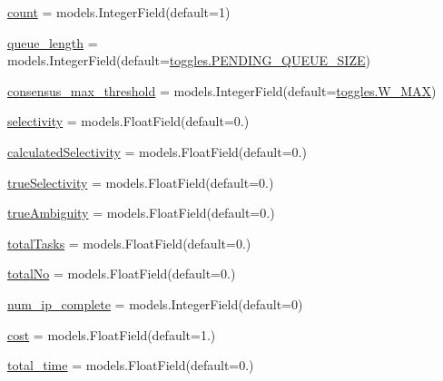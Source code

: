 \begin{DoxyCompactItemize}
\item 
\mbox{\hyperlink{classdynamicfilterapp_1_1models_1_1_predicate_ae11b3deb3de3df7dc48e439074023e35}{count}} = models.\+Integer\+Field(default=1)
\item 
\mbox{\hyperlink{classdynamicfilterapp_1_1models_1_1_predicate_a1bdc57110df8b3c72e240a7f100b4096}{queue\+\_\+length}} = models.\+Integer\+Field(default=\mbox{\hyperlink{namespacedynamicfilterapp_1_1toggles_a642cb0e1f266db761b270ea65af5425a}{toggles.\+P\+E\+N\+D\+I\+N\+G\+\_\+\+Q\+U\+E\+U\+E\+\_\+\+S\+I\+ZE}})
\item 
\mbox{\hyperlink{classdynamicfilterapp_1_1models_1_1_predicate_a8bd4e3573ed7514dc98a1615fe047c23}{consensus\+\_\+max\+\_\+threshold}} = models.\+Integer\+Field(default=\mbox{\hyperlink{namespacedynamicfilterapp_1_1toggles_add63171ca968cbd5ca4d60dfbf9a2746}{toggles.\+W\+\_\+\+M\+AX}})
\item 
\mbox{\hyperlink{classdynamicfilterapp_1_1models_1_1_predicate_af0e245c39a758c26c7eadd206d81ae15}{selectivity}} = models.\+Float\+Field(default=0.)
\item 
\mbox{\hyperlink{classdynamicfilterapp_1_1models_1_1_predicate_a188ea6f444715e91f6b9e0860893ed16}{calculated\+Selectivity}} = models.\+Float\+Field(default=0.)
\item 
\mbox{\hyperlink{classdynamicfilterapp_1_1models_1_1_predicate_ad83f72684951b87b2dc27c4e469b2bb5}{true\+Selectivity}} = models.\+Float\+Field(default=0.)
\item 
\mbox{\hyperlink{classdynamicfilterapp_1_1models_1_1_predicate_ac6b5e98e5c2a0c3bbb3ff3e84ed67248}{true\+Ambiguity}} = models.\+Float\+Field(default=0.)
\item 
\mbox{\hyperlink{classdynamicfilterapp_1_1models_1_1_predicate_a21e1aac4555eeb991df1ae938abbcfd8}{total\+Tasks}} = models.\+Float\+Field(default=0.)
\item 
\mbox{\hyperlink{classdynamicfilterapp_1_1models_1_1_predicate_a4dc8ddca0ad5a5c301c4ad4245ba4466}{total\+No}} = models.\+Float\+Field(default=0.)
\item 
\mbox{\hyperlink{classdynamicfilterapp_1_1models_1_1_predicate_a6cd98dfddbfd6b4ac23a1db75792da3c}{num\+\_\+ip\+\_\+complete}} = models.\+Integer\+Field(default=0)
\item 
\mbox{\hyperlink{classdynamicfilterapp_1_1models_1_1_predicate_a6ce3360f2586a441b79b1053cfd2769c}{cost}} = models.\+Float\+Field(default=1.)
\item 
\mbox{\hyperlink{classdynamicfilterapp_1_1models_1_1_predicate_ae4ca52b9abe06f0013a84e7b33cf30ff}{total\+\_\+time}} = models.\+Float\+Field(default=0.)

\end{DoxyCompactItemize}
